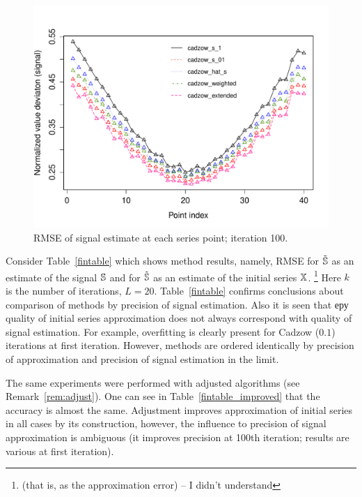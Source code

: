 \documentclass[sii]{ipart}
\begin{document}
\begin{figure}[!hhh]
		\includegraphics[width = \columnwidth]{s1_it100.pdf}
		\caption{RMSE of signal estimate at each series point; iteration 100.}
		\label{fig:s1_it100}
\end{figure}

Consider Table~\ref{fintable} which shows method results, namely, RMSE for $\tilde {\mathbb{S}}$ as an estimate of the signal $\mathbb{S}$ and for $\tilde {\mathbb{S}}$ as an estimate of the initial series $\mathbb{X}$. \footnote{(that is, as the approximation error) -- I didn't understand} Here $k$ is the number of iterations, $L=20$. Table~\ref{fintable} confirms conclusions about comparison of methods by precision of signal estimation. Also it is seen that еру quality of initial series approximation does not always correspond with quality of signal estimation. For example, overfitting is clearly present for Cadzow ($0.1$) iterations at first iteration. However, methods are ordered identically by precision of approximation and precision of signal estimation in the limit.

The same experiments were performed with adjusted algorithms (see Remark~\ref{rem:adjust}). One can see in Table~\ref{fintable_improved} that the accuracy is almost the same. Adjustment improves approximation of initial series in all cases by its construction, however, the influence to precision of signal approximation is ambiguous (it improves precision at 100th iteration; results are various at first iteration).
\end{document}
